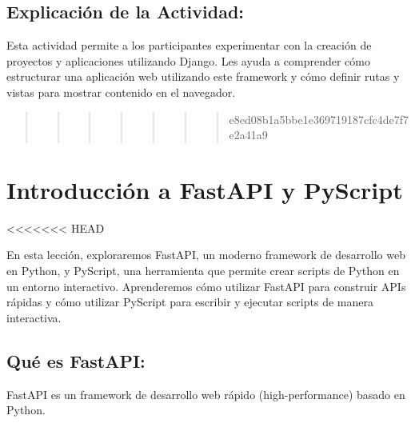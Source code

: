 \documentclass[
  a4paper,
  DIV=11,
  numbers=noendperiod,
  onepage,
  openany]{scrreprt}
\begin{document}
\hypertarget{explicaciuxf3n-de-la-actividad-81}{%
\section{Explicación de la
Actividad:}\label{explicaciuxf3n-de-la-actividad-81}}

Esta actividad permite a los participantes experimentar con la creación
de proyectos y aplicaciones utilizando Django. Les ayuda a comprender
cómo estructurar una aplicación web utilizando este framework y cómo
definir rutas y vistas para mostrar contenido en el navegador.

\begin{quote}
\begin{quote}
\begin{quote}
\begin{quote}
\begin{quote}
\begin{quote}
\begin{quote}
e8ed08b1a5bbe1e369719187cfc4de7f7e2a41a9
\end{quote}
\end{quote}
\end{quote}
\end{quote}
\end{quote}
\end{quote}
\end{quote}

\hypertarget{introducciuxf3n-a-fastapi-y-pyscript}{%
\chapter{Introducción a FastAPI y
PyScript}\label{introducciuxf3n-a-fastapi-y-pyscript}}

\textless\textless\textless\textless\textless\textless\textless{} HEAD

En esta lección, exploraremos FastAPI, un moderno framework de
desarrollo web en Python, y PyScript, una herramienta que permite crear
scripts de Python en un entorno interactivo. Aprenderemos cómo utilizar
FastAPI para construir APIs rápidas y cómo utilizar PyScript para
escribir y ejecutar scripts de manera interactiva.

\hypertarget{quuxe9-es-fastapi}{%
\section{Qué es FastAPI:}\label{quuxe9-es-fastapi}}

FastAPI es un framework de desarrollo web rápido (high-performance)
basado en Python.
\end{document}
